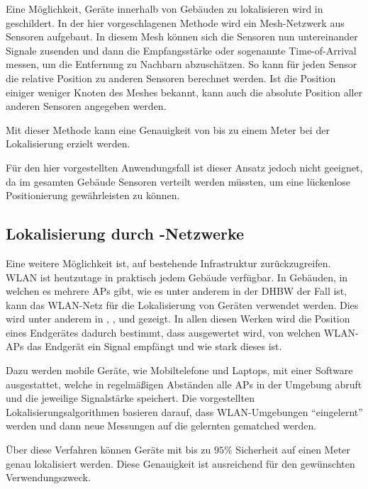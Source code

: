 Eine Möglichkeit, Geräte innerhalb von Gebäuden zu lokalisieren wird in \cite{Patwari2003}
geschildert. In der hier vorgeschlagenen Methode wird ein \gls{Mesh-Netzwerk} aus Sensoren aufgebaut.
In diesem Mesh können sich die Sensoren nun untereinander Signale zusenden und dann die
Empfangsstärke oder sogenannte Time-of-Arrival messen, um die Entfernung zu Nachbarn abzuschätzen.
So kann für jeden Sensor die relative Position zu anderen Sensoren berechnet werden.
Ist die Position einiger weniger Knoten des Meshes bekannt, kann auch die absolute Position aller
anderen Sensoren angegeben werden.

Mit dieser Methode kann eine Genauigkeit von bis zu einem Meter bei der Lokalisierung erzielt
werden.

Für den hier vorgestellten Anwendungsfall ist dieser Ansatz jedoch nicht geeignet, da im gesamten
Gebäude Sensoren verteilt werden müssten, um eine lückenlose Positionierung gewährleisten zu können.

\subsection{Lokalisierung durch -Netzwerke}

Eine weitere Möglichkeit ist, auf bestehende Infrastruktur zurückzugreifen. \Gls{WLAN} ist
heutzutage in praktisch jedem Gebäude verfügbar.
In Gebäuden, in welchen es mehrere \glspl{AP} gibt, wie es unter anderem in der \gls{DHBW} der Fall
ist, kann das \gls{WLAN}-Netz für die Lokalisierung von Geräten verwendet werden. Dies wird unter
anderem in \cite{Xiang2004}, \cite{Dong2009}, \cite{Paschalidis2009} und \cite{Liang2009} gezeigt.
In allen diesen Werken wird die Position eines Endgerätes dadurch bestimmt, dass ausgewertet wird,
von welchen \gls{WLAN}-\glspl{AP} das Endgerät ein Signal empfängt und wie stark dieses ist.

Dazu werden mobile Geräte, wie Mobiltelefone und Laptops, mit einer Software ausgestattet, welche in
regelmäßigen Abständen alle \glspl{AP} in der Umgebung abruft und die jeweilige Signalstärke
speichert. Die vorgestellten Lokalisierungsalgorithmen basieren darauf, dass \gls{WLAN}-Umgebungen
\enquote{eingelernt} werden und dann neue Messungen auf die gelernten gematched werden.

Über diese Verfahren können Geräte mit bis zu $95\%$ Sicherheit auf einen Meter genau lokalisiert
werden. Diese Genauigkeit ist ausreichend für den gewünschten Verwendungszweck.

